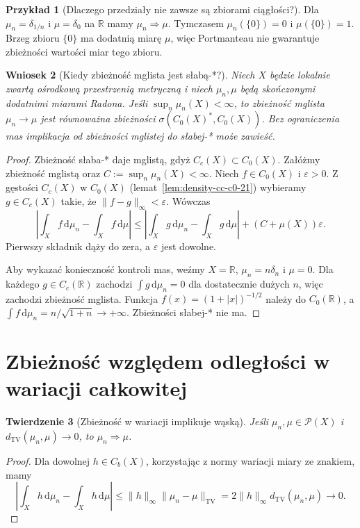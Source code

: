 \documentclass[11pt,a4paper,oneside]{book}
\numberwithin{equation}{chapter}
\theoremstyle{plain}
\newtheorem{twierdzenie}{Twierdzenie}[chapter]
\newtheorem{wniosek}[twierdzenie]{Wniosek}
\theoremstyle{definition}
\newtheorem{przyklad}[twierdzenie]{Przykład}
\theoremstyle{remark}
\begin{document}
\begin{przyklad}[Dlaczego przedziały nie zawsze są zbiorami ciągłości?]
Dla $\mu_n=\delta_{1/n}$ i $\mu=\delta_0$ na
$\mathbb R$ mamy $\mu_n\Rightarrow\mu$.
Tymczasem $\mu_n(\{0\})=0$ i $\mu(\{0\})=1$.
Brzeg zbioru $\{0\}$ ma dodatnią miarę $\mu$,
więc Portmanteau nie gwarantuje zbieżności
wartości miar tego zbioru.
\end{przyklad}

\begin{wniosek}[Kiedy zbieżność mglista jest słabą-*?]
\label{cor:vague-c0-bounded-22}
Niech $X$ będzie lokalnie zwartą ośrodkową przestrzenią
metryczną i niech $\mu_n,\mu$ będą skończonymi dodatnimi
miarami Radona. Jeśli $\sup_n\mu_n(X)<\infty$, to
zbieżność mglista $\mu_n\to\mu$ jest równoważna zbieżności
$\sigma(C_0(X)^*,C_0(X))$.
Bez ograniczenia mas implikacja od zbieżności mglistej
do słabej-* może zawieść.
\end{wniosek}
\begin{proof}
Zbieżność słaba-* daje mglistą, gdyż $C_c(X)\subset C_0(X)$.
Załóżmy zbieżność mglistą oraz $C:=\sup_n\mu_n(X)<\infty$.
Niech $f\in C_0(X)$ i $\varepsilon>0$. Z gęstości
$C_c(X)$ w $C_0(X)$ (lemat~\ref{lem:density-cc-c0-21})
wybieramy $g\in C_c(X)$ takie, że
$\|f-g\|_\infty<\varepsilon$. Wówczas
\[
 \left|\int_X f\,\mathrm d\mu_n-\int_X f\,\mathrm d\mu\right|
 \le\left|\int_Xg\,\mathrm d\mu_n-\int_Xg\,\mathrm d\mu\right|
 +(C+\mu(X))\varepsilon.
\]
Pierwszy składnik dąży do zera, a $\varepsilon$ jest dowolne.

Aby wykazać konieczność kontroli mas, weźmy
$X=\mathbb R$, $\mu_n=n\delta_n$ i $\mu=0$.
Dla każdego $g\in C_c(\mathbb R)$ zachodzi
$\int g\,\mathrm d\mu_n=0$ dla dostatecznie dużych $n$,
więc zachodzi zbieżność mglista. Funkcja
$f(x)=(1+|x|)^{-1/2}$ należy do $C_0(\mathbb R)$,
a $\int f\,\mathrm d\mu_n=n/\sqrt{1+n}\to+\infty$.
Zbieżności słabej-* nie ma.
\end{proof}

\section{Zbieżność względem odległości w wariacji całkowitej}
\begin{twierdzenie}[Zbieżność w wariacji implikuje wąską]
\label{thm:tv-implies-narrow-22}
Jeśli $\mu_n,\mu\in\mathcal P(X)$ i
$d_{\mathrm{TV}}(\mu_n,\mu)\to0$, to
$\mu_n\Rightarrow\mu$.
\end{twierdzenie}
\begin{proof}
Dla dowolnej $h\in C_b(X)$, korzystając z normy
wariacji miary ze znakiem, mamy
\[
\left|\int_Xh\,\mathrm d\mu_n-\int_Xh\,\mathrm d\mu\right|
\le \|h\|_\infty\|\mu_n-\mu\|_{\mathrm{TV}}
=2\|h\|_\infty d_{\mathrm{TV}}(\mu_n,\mu)\to0.
\]
\end{proof}
\end{document}
